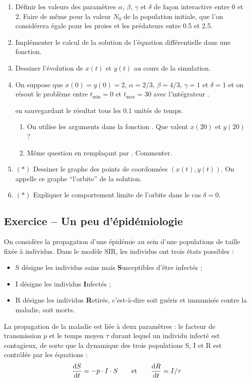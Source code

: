 \documentclass{article}
\newcounter{loop}
\newcounter{numEx}
\newcommand{\exo}[1]{
	\stepcounter{numEx}
	\setcounter{loop}{0}
	\subsection*{Exercice \arabic{numEx} -- #1}
}
\begin{document}
\begin{enumerate}
	\item Définir les valeurs des paramètres $\alpha$, $\beta$, $\gamma$ et $\delta$ de façon interactive entre 0 et 2. Faire de même pour la valeur $N_0$ de la population initiale, que l'on considérera égale pour les proies et les prédateurs entre 0.5 et 2.5.
	
	\item Implémenter le calcul de la solution de l'équation différentielle dans une fonction.

	\item Dessiner l'évolution de $x(t)$ et $y(t)$ au cours de la simulation.

	\item On suppose que $x(0) = y(0) = 2$, $\alpha = 2/3$, $\beta = 4/3$, $\gamma=1$ et $\delta=1$ et on résout le problème entre $t_{\min} = 0$ et $t_{\max} = 30$ avec l'intégrateur .
	
	 en sauvegardant le résultat tous les $0.1$ unités de temps.
	\begin{enumerate}
		\item On utilise les arguments  dans la fonction . Que valent $x(20)$ et $y(20)$ ?
		
		\item Même question en remplaçant  par . Commenter.
	\end{enumerate}

	\item $(*)$ Dessiner le graphe des points de coordonnées $(x(t), y(t))$. On appelle ce graphe ``l'orbite'' de la solution.
	
	\item $(*)$ Expliquer le comportement limite de l'orbite dans le cas $\delta = 0$.

\end{enumerate}

\exo{Un peu d'épidémiologie}

On considère la propagation d'une épidémie au sein d'une populations de taille fixée à  individus. Dans le modèle SIR, les individus ont trois états possibles :
\begin{itemize}
	\item S désigne les individus sains mais \textbf{S}usceptibles d'être infectés ;
	\item I désigne les individus \textbf{I}nfectés ;
	\item R désigne les individus \textbf{R}etirés, c'est-à-dire soit guéris et immunisés contre la maladie, soit morts.
\end{itemize}
La propagation de la maladie est liée à deux paramètres : le facteur de transmission $p$ et le temps moyen $\tau$ durant lequel un individu infecté est contagieux, de sorte que la dynamique des trois populations S, I et R est contrôlée par les équations :
\[\frac{\text dS}{\text dt} = - p\cdot I\cdot S\qquad\text{et}\qquad\frac{\text dR}{\text dt} = I/\tau\]
\end{document}
